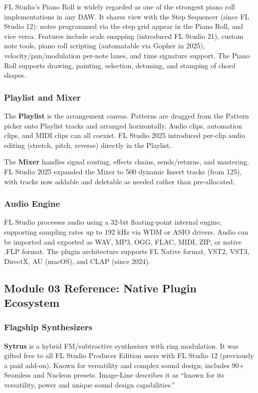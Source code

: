 \documentclass[11pt,letterpaper]{article}
\begin{document}
FL Studio's Piano Roll is widely regarded as one of the strongest piano roll implementations in any DAW. It shares view with the Step Sequencer (since FL Studio 12): notes programmed via the step grid appear in the Piano Roll, and vice versa. Features include scale snapping (introduced FL Studio 21), custom note tools, piano roll scripting (automatable via Gopher in 2025), velocity/pan/modulation per-note lanes, and time signature support. The Piano Roll supports drawing, painting, selection, detuning, and stamping of chord shapes.

\subsubsection{Playlist and Mixer}

The \textbf{Playlist} is the arrangement canvas. Patterns are dragged from the Pattern picker onto Playlist tracks and arranged horizontally. Audio clips, automation clips, and MIDI clips can all coexist. FL Studio 2025 introduced per-clip audio editing (stretch, pitch, reverse) directly in the Playlist.

The \textbf{Mixer} handles signal routing, effects chains, sends/returns, and mastering. FL Studio 2025 expanded the Mixer to 500 dynamic Insert tracks (from 125), with tracks now addable and deletable as needed rather than pre-allocated.

\subsubsection{Audio Engine}

FL Studio processes audio using a 32-bit floating-point internal engine, supporting sampling rates up to 192 kHz via WDM or ASIO drivers. Audio can be imported and exported as WAV, MP3, OGG, FLAC, MIDI, ZIP, or native .FLP format. The plugin architecture supports FL Native format, VST2, VST3, DirectX, AU (macOS), and CLAP (since 2024).

\subsection{Module 03 Reference: Native Plugin Ecosystem}

\subsubsection{Flagship Synthesizers}

\textbf{Sytrus} is a hybrid FM/subtractive synthesizer with ring modulation. It was gifted free to all FL Studio Producer Edition users with FL Studio 12 (previously a paid add-on). Known for versatility and complex sound design; includes 90+ Seamless and Nucleon presets. Image-Line describes it as ``known for its versatility, power and unique sound design capabilities.''
\end{document}
